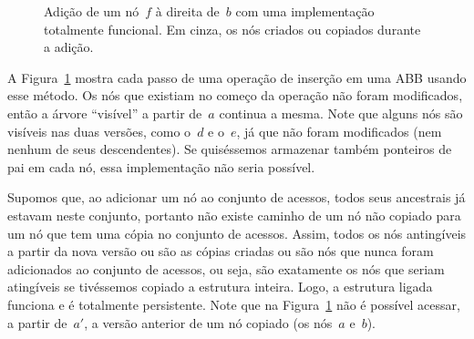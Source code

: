 \documentclass[../../main.tex]{subfiles}
\begin{document}
\begin{figure}
	\centering
	\caption{Adição de um nó~$f$ à direita de~$b$ com uma implementação totalmente funcional. Em cinza, os nós criados ou copiados durante a adição.} \label{fig:totfunc_ex}
\end{figure}

A Figura~\ref{fig:totfunc_ex} mostra cada passo de uma operação de inserção em uma ABB usando esse método. Os nós que existiam no começo da operação não foram modificados, então a árvore ``visível'' a partir de~$a$ continua a mesma. Note que alguns nós são visíveis nas duas versões, como o~$d$ e o~$e$, já que não foram modificados (nem nenhum de seus descendentes). Se quiséssemos armazenar também ponteiros de pai em cada nó, essa implementação não seria possível.

Supomos que, ao adicionar um nó ao conjunto de acessos, todos seus ancestrais já estavam neste conjunto, portanto não existe caminho de um nó não copiado para um nó que tem uma cópia no conjunto de acessos. Assim, todos os nós antingíveis a partir da nova versão ou são as cópias criadas ou são nós que nunca foram adicionados ao conjunto de acessos, ou seja, são exatamente os nós que seriam atingíveis se tivéssemos copiado a estrutura inteira. Logo, a estrutura ligada funciona e é totalmente persistente. Note que na Figura~\ref{fig:totfunc_ex} não é possível acessar, a partir de~$a'$, a versão anterior de um nó copiado (os nós~$a$ e~$b$).
\end{document}
